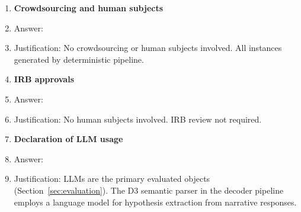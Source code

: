 \documentclass{article}
\theoremstyle{definition}
\begin{document}
\begin{enumerate}
\item {\bf Crowdsourcing and human subjects}
    \item[] Answer: \answerNA{}
    \item[] Justification: No crowdsourcing or human subjects involved. All instances generated by deterministic pipeline.

\item {\bf IRB approvals}
    \item[] Answer: \answerNA{}
    \item[] Justification: No human subjects involved. IRB review not required.

\item {\bf Declaration of LLM usage}
    \item[] Answer: \answerYes{}
    \item[] Justification: LLMs are the primary evaluated objects (Section~\ref{sec:evaluation}). The D3 semantic parser in the decoder pipeline employs a language model for hypothesis extraction from narrative responses.

\end{enumerate}
\end{document}
